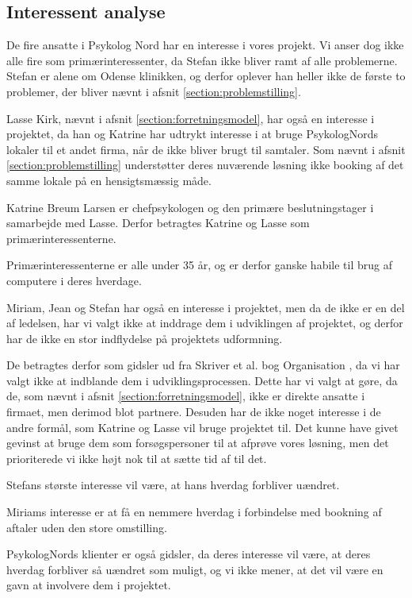 \subsection{Interessent analyse}

De fire ansatte i Psykolog Nord har en interesse i vores projekt. Vi anser dog ikke alle fire som primærinteressenter, da Stefan ikke bliver ramt af alle problemerne.
Stefan er alene om Odense klinikken, og derfor oplever han heller ikke de første to problemer, der bliver nævnt i afsnit \ref{section:problemstilling}.

Lasse Kirk, nævnt i afsnit \ref{section:forretningsmodel}, har også en interesse i projektet, da han og Katrine har udtrykt interesse i at bruge PsykologNords lokaler til et andet firma, når de ikke bliver brugt til samtaler.
Som nævnt i afsnit \ref{section:problemstilling} understøtter deres nuværende løsning ikke booking af det samme lokale på en hensigtsmæssig måde.

Katrine Breum Larsen er chefpsykologen og den primære beslutningstager i samarbejde med Lasse.
Derfor betragtes Katrine og Lasse som primærinteressenterne.

Primærinteressenterne er alle under 35 år, og er derfor ganske habile til brug af computere i deres hverdage.

Miriam, Jean og Stefan har også en interesse i projektet, men da de ikke er en del af ledelsen, har vi valgt ikke at inddrage dem i udviklingen af projektet, og derfor har de ikke en stor indflydelse på projektets udformning.

De betragtes derfor som gidsler ud fra Skriver et al. bog Organisation \cite[s. 435]{interessentanalyse}, da vi har valgt ikke at indblande dem i udviklingsprocessen.
Dette har vi valgt at gøre, da de, som nævnt i afsnit \ref{section:forretningsmodel}, ikke er direkte ansatte i firmaet, men derimod blot partnere.
Desuden har de ikke noget interesse i de andre formål, som Katrine og Lasse vil bruge projektet til. 
Det kunne have givet gevinst at bruge dem som forsøgspersoner til at afprøve vores løsning, men det prioriterede vi ikke højt nok til at sætte tid af til det.

Stefans største interesse vil være, at hans hverdag forbliver uændret.

Miriams interesse er at få en nemmere hverdag i forbindelse med bookning af aftaler uden den store omstilling.

PsykologNords klienter er også gidsler, da deres interesse vil være, at deres hverdag forbliver så uændret som muligt, og vi ikke mener, at det vil være en gavn at involvere dem i projektet.